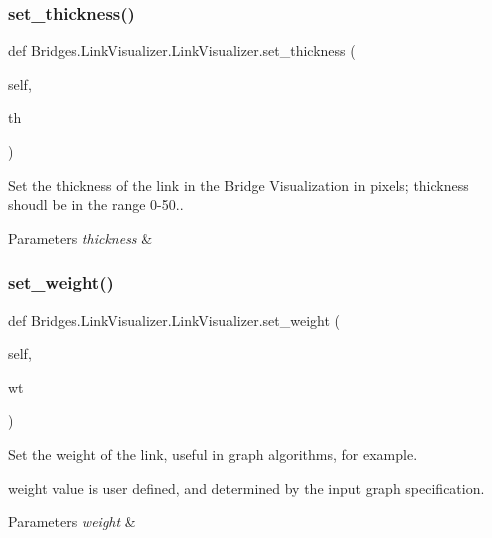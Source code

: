 \subsubsection{\texorpdfstring{set\+\_\+thickness()}{set\_thickness()}}
{\footnotesize\ttfamily def Bridges.\+Link\+Visualizer.\+Link\+Visualizer.\+set\+\_\+thickness (\begin{DoxyParamCaption}\item[{}]{self,  }\item[{}]{th }\end{DoxyParamCaption})}



Set the thickness of the link in the Bridge Visualization in pixels; thickness shoudl be in the range 0-\/50.. 


\begin{DoxyParams}{Parameters}
{\em thickness} & \\
\hline
\end{DoxyParams}
\mbox{\label{class_bridges_1_1_link_visualizer_1_1_link_visualizer_a289630a8863773ef59c338befb821adf}} 
\subsubsection{\texorpdfstring{set\+\_\+weight()}{set\_weight()}}
{\footnotesize\ttfamily def Bridges.\+Link\+Visualizer.\+Link\+Visualizer.\+set\+\_\+weight (\begin{DoxyParamCaption}\item[{}]{self,  }\item[{}]{wt }\end{DoxyParamCaption})}



Set the weight of the link, useful in graph algorithms, for example. 

weight value is user defined, and determined by the input graph specification.


\begin{DoxyParams}{Parameters}
{\em weight} & \\
\hline
\end{DoxyParams}


